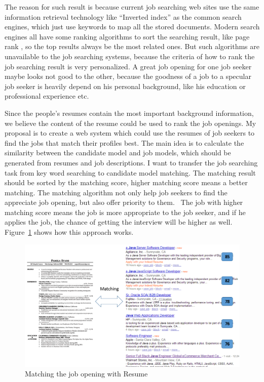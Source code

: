 The reason for such result is because current job searching web sites use the same information retrieval technology like ``Inverted index'' \cite{zobel2006inverted} as the common search engines, which just use keywords to map all the stored documents. Modern search engines all have some ranking algorithms to sort the searching result, like page rank \cite{page1999pagerank}, so the top results always be the most related ones. But such algorithms are unavailable to the job searching systems, because the criteria  of how to rank the job searching result is very personalized. A great job opening for one job seeker maybe looks not good to the other, because the goodness of a job to a specular job seeker is heavily depend on his personal background, like his education or professional experience etc.

Since the people's resumes contain the most important background information, we believe the content of the resume could be used to rank the job openings. My proposal is to create a web system which could use the resumes of job seekers to find the jobs that match their profiles best. The main idea is to calculate the similarity between the candidate model and job models, which should be generated from resumes and job descriptions. I want to transfer the job searching task from key word searching to candidate model matching. The matching result should be sorted by the matching score, higher matching score means a better matching. The matching algorithm not only help job seekers to find the appreciate job opening, but also offer priority to them.~\cite{gueutal2006brave}  The job with higher matching score means the job is more appropriate to the job seeker, and if he applies the job, the chance of getting the interview will be higher as well. Figure~\ref{fig:Matching} shows how this approach works.


\begin{figure}[htbp]
  \centering
  \includegraphics[scale=0.5]{images/matching.png}
  \caption{Matching the job opening with Resume}
  \label{fig:Matching}
\end{figure}
